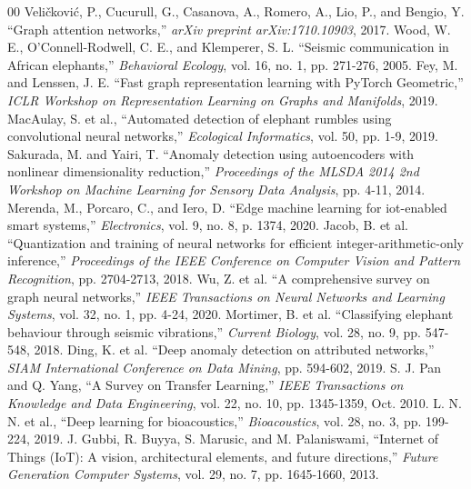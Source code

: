 \documentclass[conference, a4paper]{IEEEtran}
\begin{document}
\begin{thebibliography}{00}
 Veli\v{c}kovi\'{c}, P., Cucurull, G., Casanova, A., Romero, A., Lio, P., and Bengio, Y. ``Graph attention networks,'' \textit{arXiv preprint arXiv:1710.10903}, 2017.
 Wood, W. E., O'Connell-Rodwell, C. E., and Klemperer, S. L. ``Seismic communication in African elephants,'' \textit{Behavioral Ecology}, vol. 16, no. 1, pp. 271-276, 2005.
 Fey, M. and Lenssen, J. E. ``Fast graph representation learning with PyTorch Geometric,'' \textit{ICLR Workshop on Representation Learning on Graphs and Manifolds}, 2019.
 MacAulay, S. et al., ``Automated detection of elephant rumbles using convolutional neural networks,'' \textit{Ecological Informatics}, vol. 50, pp. 1-9, 2019.
 Sakurada, M. and Yairi, T. ``Anomaly detection using autoencoders with nonlinear dimensionality reduction,'' \textit{Proceedings of the MLSDA 2014 2nd Workshop on Machine Learning for Sensory Data Analysis}, pp. 4-11, 2014.
 Merenda, M., Porcaro, C., and Iero, D. ``Edge machine learning for iot-enabled smart systems,'' \textit{Electronics}, vol. 9, no. 8, p. 1374, 2020.
 Jacob, B. et al. ``Quantization and training of neural networks for efficient integer-arithmetic-only inference,'' \textit{Proceedings of the IEEE Conference on Computer Vision and Pattern Recognition}, pp. 2704-2713, 2018.
 Wu, Z. et al. ``A comprehensive survey on graph neural networks,'' \textit{IEEE Transactions on Neural Networks and Learning Systems}, vol. 32, no. 1, pp. 4-24, 2020.
 Mortimer, B. et al. ``Classifying elephant behaviour through seismic vibrations,'' \textit{Current Biology}, vol. 28, no. 9, pp. 547-548, 2018.
 Ding, K. et al. ``Deep anomaly detection on attributed networks,'' \textit{SIAM International Conference on Data Mining}, pp. 594-602, 2019.
 S. J. Pan and Q. Yang, ``A Survey on Transfer Learning,'' \textit{IEEE Transactions on Knowledge and Data Engineering}, vol. 22, no. 10, pp. 1345-1359, Oct. 2010.
 L. N. N. et al., ``Deep learning for bioacoustics,'' \textit{Bioacoustics}, vol. 28, no. 3, pp. 199-224, 2019.
 J. Gubbi, R. Buyya, S. Marusic, and M. Palaniswami, ``Internet of Things (IoT): A vision, architectural elements, and future directions,'' \textit{Future Generation Computer Systems}, vol. 29, no. 7, pp. 1645-1660, 2013.
\end{thebibliography}
\end{document}
